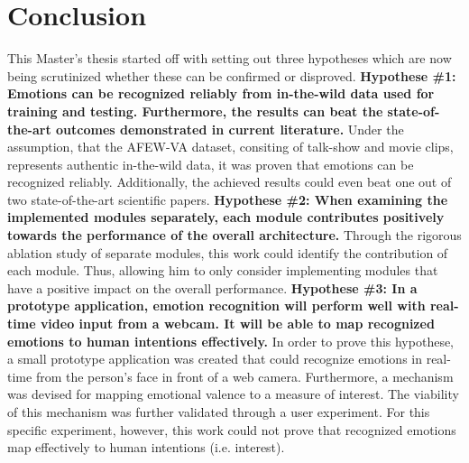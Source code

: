 
\chapter{Conclusion}
This Master's thesis started off with setting out three hypotheses which are now being scrutinized whether these can be confirmed or disproved.\newline\newline
\textbf{Hypothese \#1: Emotions can be recognized reliably from in-the-wild data used for training and testing. Furthermore, the results can beat the state-of-the-art outcomes demonstrated in current literature.}\newline
Under the assumption, that the AFEW-VA dataset, consiting of talk-show and movie clips, represents authentic in-the-wild data, it was proven that emotions can be recognized reliably. Additionally, the achieved results could even beat one out of two state-of-the-art scientific papers.
\newline\newline
\textbf{Hypothese \#2: When examining the implemented modules separately, each module contributes positively towards the performance of the overall architecture.}\newline
Through the rigorous ablation study of separate modules, this work could identify the contribution of each module. Thus, allowing him to only consider implementing modules that have a positive impact on the overall performance.
\newline\newline
\textbf{Hypothese \#3: In a prototype application, emotion recognition will perform well with real-time video input from a webcam. It will be able to map recognized emotions to human intentions effectively.}\newline
In order to prove this hypothese, a small prototype application was created that could recognize emotions in real-time from the person's face in front of a web camera. Furthermore, a mechanism was devised for mapping emotional valence to a measure of interest. The viability of this mechanism was further validated through a user experiment. For this specific experiment, however, this work could not prove that recognized emotions map effectively to human intentions (i.e. interest).


